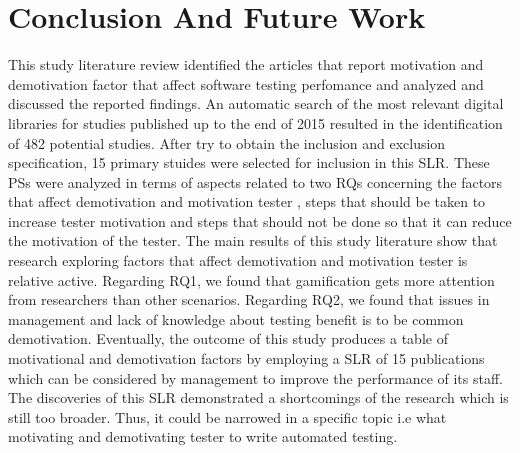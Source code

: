 \documentclass[conference, compsoc, twoside]{IEEEtran}
\begin{document}
\section{Conclusion And Future Work}
This study literature review identified the articles that report motivation and demotivation factor that affect software testing perfomance and analyzed and discussed the reported findings. 
An automatic search of the most relevant digital libraries for studies published up to the end of 2015 resulted in the identification of 482 potential studies. 
After try to obtain the inclusion and exclusion specification, 15 primary stuides were selected for inclusion in this SLR. 
These PSs were analyzed in terms of aspects related to two RQs concerning the factors that affect demotivation and motivation tester , steps that should be taken to increase tester motivation and steps that should not be done so that it can reduce the motivation of the tester.
The main results of this study literature show that research exploring factors that affect demotivation and motivation tester is relative active. 
Regarding RQ1, we found that gamification gets more attention from researchers than other scenarios. 
Regarding RQ2, we found that issues in management and lack of knowledge about testing benefit is to be common demotivation.
Eventually, the outcome of this study produces a table of motivational and demotivation factors by employing a SLR of 15 publications which can be considered by management to improve the performance of its staff.
The discoveries of this SLR demonstrated a shortcomings of the research which is still too broader. Thus, it could be narrowed in a specific topic i.e what motivating and demotivating tester to write automated testing. 


\end{document}
